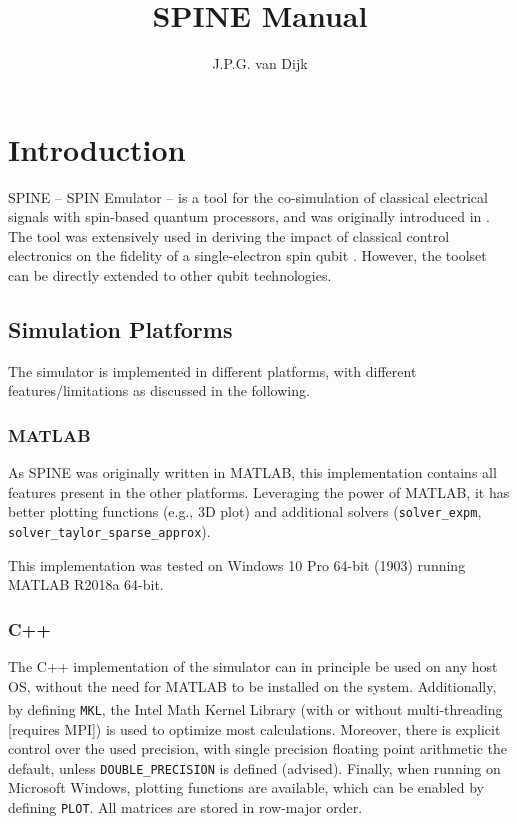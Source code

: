 \documentclass[10pt,a4paper,onecolumn,notitlepage]{article}
\title{SPINE Manual}
\author{J.P.G. van Dijk}
\begin{document}

\maketitle
\tableofcontents
\clearpage

\section{Introduction}
SPINE -- SPIN Emulator -- is a tool for the co-simulation of classical electrical signals with spin-based quantum processors, and was originally introduced in \cite{van2018co,van2019spine}. The tool was extensively used in deriving the impact of classical control electronics on the fidelity of a single-electron spin qubit \cite{van2019impact}. However, the toolset can be directly extended to other qubit technologies.

\subsection{Simulation Platforms}
The simulator is implemented in different platforms, with different features/limitations as discussed in the following.

\subsubsection{MATLAB}
As SPINE was originally written in MATLAB, this implementation contains all features present in the other platforms. Leveraging the power of MATLAB, it has better plotting functions (e.g., 3D plot) and additional solvers (\lstinline{solver_expm}, \lstinline{solver_taylor_sparse_approx}).

This implementation was tested on Windows 10 Pro 64-bit (1903) running MATLAB R2018a 64-bit.

\subsubsection{C++}
The C++ implementation of the simulator can in principle be used on any host OS, without the need for MATLAB to be installed on the system. Additionally, by defining \lstinline{MKL}, the Intel\textsuperscript{\textcopyright} Math Kernel Library (with or without multi-threading [requires MPI]) is used to optimize most calculations. Moreover, there is explicit control over the used precision, with single precision floating point arithmetic the default, unless \lstinline{DOUBLE_PRECISION} is defined (advised). Finally, when running on Microsoft Windows, plotting functions are available, which can be enabled by defining \lstinline{PLOT}. All matrices are stored in row-major order.
\end{document}
